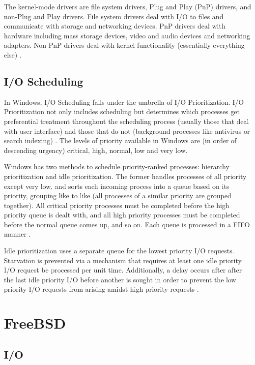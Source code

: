 \documentclass[10pt,draftclsnofoot,onecolumn,compsoc]{IEEEtran}
\begin{document}
	The kernel-mode drivers are file system drivers, Plug and Play (PnP) drivers, and non-Plug and Play drivers. File system drivers deal with I/O to files and communicate with storage and networking devices. PnP drivers deal with hardware including mass storage devices, video and audio devices and networking adapters. Non-PnP drivers deal with kernel functionality (essentially everything else) \cite{WInternals}.
	
	\subsection{I/O Scheduling}
	
	In Windows, I/O Scheduling falls under the umbrella of I/O Prioritization. I/O Prioritization not only includes scheduling but determines which processes get preferential treatment throughout the scheduling process (usually those that deal with user interface) and those that do not (background processes like antivirus or search indexing) \cite{WInternals}. The levels of priority available in Windows are (in order of descending urgency) critical, high, normal, low and very low.
	
	Windows has two methods to schedule priority-ranked processes: hierarchy prioritization and idle prioritization. The former handles processes of all priority except very low, and sorts each incoming process into a queue based on its priority, grouping like to like (all processes of a similar priority are grouped together). All critical priority processes must be completed before the high priority queue is dealt with, and all high priority processes must be completed before the normal queue comes up, and so on. Each queue is processed in a FIFO manner \cite{WInternals}.
	
	Idle prioritization uses a separate queue for the lowest priority I/O requests. Starvation is prevented via a mechanism that requires at least one idle priority I/O request be processed per unit time. Additionally, a delay occurs after after the last idle priority I/O before another is sought in order to prevent the low priority I/O requests from arising amidst high priority requests \cite{WInternals}.
	
	\section{FreeBSD}
	
	\subsection{I/O}
	
\end{document}
